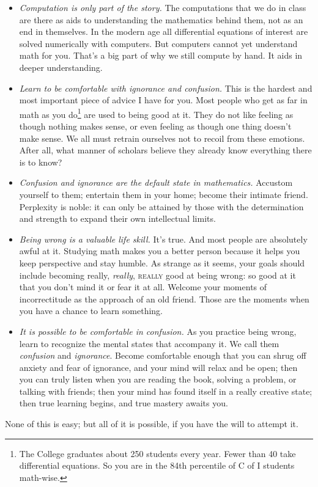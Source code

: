 \documentclass[twocolumn,12pt]{article}
\begin{document}
\begin{itemize}
    \item \emph{Computation is only part of the story.} The computations that we do in class are there as aids to understanding the mathematics behind them, not as an end in themselves. In the modern age all differential equations of interest are solved numerically with computers. But computers cannot yet understand math for you. That's a big part of why we still compute by hand. It aids in deeper understanding.
    \item \emph{Learn to be comfortable with ignorance and confusion.} This is the hardest and most important piece of advice I have for you. Most people who get as far in math as you do\footnote{The College graduates about 250 students every year. Fewer than 40 take differential equations. So you are in the 84th percentile of C of I students math-wise.} are used to being good at it. They do not like feeling as though nothing makes sense, or even feeling as though one thing doesn't make sense. We all must retrain ourselves not to recoil from these emotions. After all, what manner of scholars believe they already know everything there is to know? 
    \item \emph{Confusion and ignorance are the default state in mathematics.} Accustom yourself to them; entertain them in your home; become their intimate friend. Perplexity is noble: it can only be attained by those with the determination and strength to expand their own intellectual limits. 
    \item \emph{Being wrong is a valuable life skill.} It's true. And most people are absolutely awful at it. Studying math makes you a better person because it helps you keep perspective and stay humble. As strange as it seems, your goals should include becoming really, \emph{really}, \textsc{really} good at being wrong: so good at it that you don't mind it or fear it at all. Welcome your moments of incorrectitude as the approach of an old friend. Those are the moments when you have a chance to learn something.
    \item \emph{It is possible to be comfortable in confusion.} As you practice being wrong, learn to recognize the mental states that accompany it. We call them \emph{confusion} and \emph{ignorance}. Become comfortable enough that you can shrug off anxiety and fear of ignorance, and your mind will relax and be open; then you can truly listen when you are reading the book, solving a problem, or talking with friends; then your mind has found itself in a really creative state; then true learning begins, and true mastery awaits you.
\end{itemize}
None of this is easy; but all of it is possible, if you have the will to attempt it.
\end{document}
